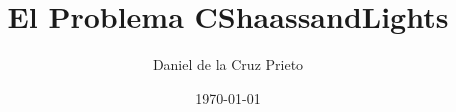 \documentclass[12pt]{article}
\begin{document}
    \title{El Problema CShaassandLights}
    \author{Daniel de la Cruz Prieto}
    \date{\today}

    \maketitle 






\end{document}
